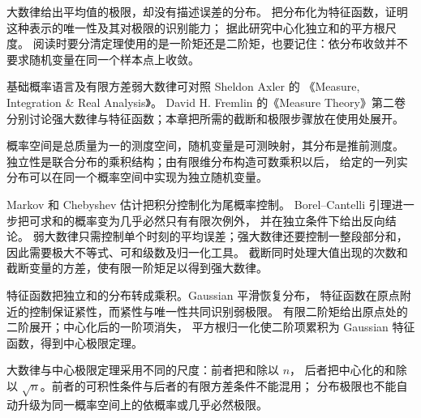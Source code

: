 大数律给出平均值的极限，却没有描述误差的分布。
把分布化为特征函数，证明这种表示的唯一性及其对极限的识别能力；
据此研究中心化独立和的平方根尺度。
阅读时要分清定理使用的是一阶矩还是二阶矩，也要记住：依分布收敛并不要求随机变量在同一个样本点上收敛。

\ProseParagraphBreak

基础概率语言及有限方差弱大数律可对照 Sheldon Axler 的
《Measure, Integration \& Real Analysis》\cite[Chapter~12]{Axler2020Measure}。
David H. Fremlin 的《Measure Theory》第二卷\cite[273, 285]{Fremlin2016Measure}
分别讨论强大数律与特征函数；本章把所需的截断和极限步骤放在使用处展开。









\begin{chaptersummary}
概率空间是总质量为一的测度空间，随机变量是可测映射，其分布是推前测度。
独立性是联合分布的乘积结构；由有限维分布构造可数乘积以后，
给定的一列实分布可以在同一个概率空间中实现为独立随机变量。

\ProseParagraphBreak

Markov 和 Chebyshev 估计把积分控制化为尾概率控制。
Borel--Cantelli 引理进一步把可求和的概率变为几乎必然只有有限次例外，
并在独立条件下给出反向结论。
弱大数律只需控制单个时刻的平均误差；强大数律还要控制一整段部分和，
因此需要极大不等式、可和级数及归一化工具。
截断同时处理大值出现的次数和截断变量的方差，使有限一阶矩足以得到强大数律。

\ProseParagraphBreak

特征函数把独立和的分布转成乘积。Gaussian 平滑恢复分布，
特征函数在原点附近的控制保证紧性，而紧性与唯一性共同识别弱极限。
有限二阶矩给出原点处的二阶展开；中心化后的一阶项消失，
平方根归一化使二阶项累积为 Gaussian 特征函数，得到中心极限定理。

\ProseParagraphBreak

大数律与中心极限定理采用不同的尺度：前者把和除以 \(n\)，
后者把中心化的和除以 \(\sqrt n\)。前者的可积性条件与后者的有限方差条件不能混用；
分布极限也不能自动升级为同一概率空间上的依概率或几乎必然极限。
\end{chaptersummary}

\BookExercises

